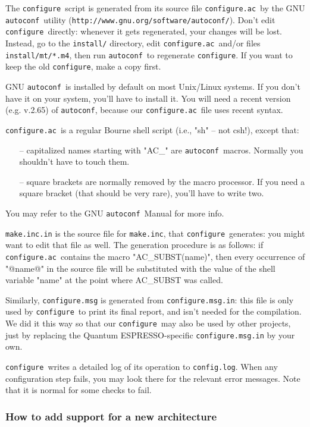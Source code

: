 \documentclass[12pt,a4paper]{article}
\def\qe{{\sc Quantum ESPRESSO}}
\def\configure{\texttt{configure}}
\def\configurac{\texttt{configure.ac}}
\def\autoconf{\texttt{autoconf}}
\def\make.inc{\texttt{make.inc}}
\begin{document}
\label{SubSec:conf}
The \configure\ script is generated from its source file
\configurac\ by the GNU \autoconf\ utility
(\texttt{http://www.gnu.org/software/autoconf/}).  Don't edit \configure\
directly: whenever it gets regenerated, your changes will be lost.
Instead, go to the \texttt{install/} directory, edit \configurac\ and/or
files \texttt{install/mt/*.m4}, then run \autoconf\ to regenerate \configure.
If you want to keep the old \configure, make a copy first.

GNU \autoconf\ is installed by default on most Unix/Linux systems.  If
you don't have it on your system, you'll have to install it. You will
need a recent version (e.g. v.2.65) of \autoconf, because our
\configurac\
file uses recent syntax.

\configurac\ is a regular Bourne shell script (i.e., "sh" -- not csh!),
except that:
\begin{itemize}
\item[--] capitalized names starting with "AC\_" are \autoconf\
  macros.  Normally you shouldn't have to touch them.
\item[--] square brackets are normally removed by the macro processor.
  If you need a square bracket (that should be very rare), you'll have
  to write two.
\end{itemize}

You may refer to the GNU \autoconf\ Manual for more info.

\texttt{make.inc.in} is the source file for \make.inc, that
\configure\ generates: you might want to edit that file as well.
The generation procedure is as follows: if \configurac\ contains the macro
"AC\_SUBST(name)", then every occurrence of "@name@" in the source
file will be substituted with the value of the shell variable "name"
at the point where AC\_SUBST was called.

Similarly, \configure\texttt{.msg} is generated from \configure\texttt{.msg.in}: this
file is only used by \configure\ to print its final report, and isn't
needed for the compilation.  We did it this way so that our
\configure\ may also be used by other projects, just by replacing the
\qe-specific \configure\texttt{.msg.in} by your own.

\configure\ writes a detailed log of its operation to \texttt{config.log}.
When any configuration step fails, you may look there for the relevant
error messages.  Note that it is normal for some checks to fail.

\subsubsection{How to add support for a new architecture}
\end{document}
